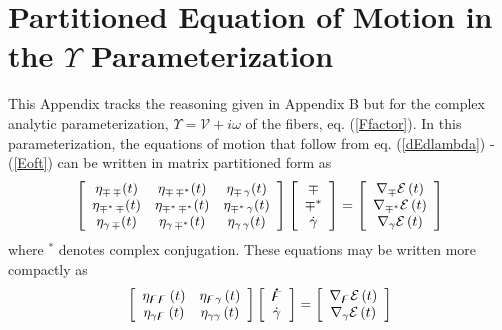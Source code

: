 \documentclass[aps,preprint]{revtex4}%
\begin{document}
\section{Partitioned Equation of Motion in the $\Upsilon$ Parameterization}

This Appendix tracks the reasoning given in Appendix B but for the complex
analytic parameterization, $\Upsilon=\mathcal{V}+i\omega$ of the fibers, eq.
(\ref{Ffactor}). In this parameterization, the equations of motion that follow
from eq. (\ref{dEdlambda}) - (\ref{Eoft}) can be written in matrix partitioned
form as
\begin{equation}
\left[
\begin{array}
[c]{ccc}%
\eta_{\mathcal{\Upsilon}\,\mathcal{\Upsilon}}(t) & \eta_{\mathcal{\Upsilon
}\,\mathcal{\Upsilon}^{\ast}}(t) & \eta_{\mathcal{\Upsilon}\,\gamma}(t)\\
\eta_{\mathcal{\Upsilon}^{\ast}\,\mathcal{\Upsilon}}(t) & \eta
_{\mathcal{\Upsilon}^{\ast}\,\mathcal{\Upsilon}^{\ast}}(t) & \eta
_{\mathcal{\Upsilon}^{\ast}\,\gamma}(t)\\
\eta_{\gamma\,\mathcal{\Upsilon}}(t) & \eta_{\gamma\,\mathcal{\Upsilon}^{\ast
}}(t) & \eta_{\gamma\,\gamma}(t)
\end{array}
\right]  \left[
\begin{array}
[c]{c}%
\mathcal{\Upsilon}\\
\mathcal{\Upsilon}^{\ast}\\
\dot{\gamma}%
\end{array}
\right]  =\left[
\begin{array}
[c]{c}%
\nabla_{\mathcal{\Upsilon}}\mathcal{E}\left(  t\right) \\
\nabla_{\mathcal{\Upsilon}^{\ast}}\mathcal{E}\left(  t\right) \\
\nabla_{\gamma}\mathcal{E}\left(  t\right)
\end{array}
\right]  \label{3x3partmat}%
\end{equation}
where $^{\ast}$ denotes complex conjugation. These equations may be written
more compactly as
\begin{equation}
\left[
\begin{array}
[c]{cc}%
\eta_{\mathbf{\digamma\digamma}}\left(  t\right)  & \eta_{\mathbf{\digamma
}\gamma}\left(  t\right) \\
\eta_{\gamma\mathbf{\digamma}}\left(  t\right)  & \eta_{\gamma\gamma}\left(
t\right)
\end{array}
\right]  \left[
\begin{array}
[c]{c}%
\mathbf{\dot{\digamma}}\\
\dot{\gamma}%
\end{array}
\right]  =\left[
\begin{array}
[c]{c}%
\nabla_{\mathbf{\digamma}}\mathcal{E}\left(  t\right) \\
\nabla_{\gamma}\mathcal{E}\left(  t\right)
\end{array}
\right]  \label{partmat2}%
\end{equation}
\end{document}
